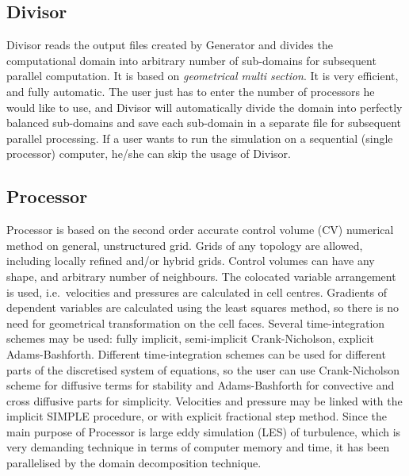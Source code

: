 \documentclass[10pt]{article}
\newcommand*{\tn}{\sffamily} %
\begin{document}
    \subsection{{\tn Divisor}}

    {\tn Divisor} reads the output files created by 
    {\tn Generator} and divides the computational domain into 
    arbitrary number of sub-domains for subsequent parallel 
    computation.
    It is based on {\em geometrical multi section}. It is very
    efficient, and fully automatic. The user just has to
    enter the number of processors he would like to use, and
    {\tn Divisor} will automatically divide the domain into
    perfectly balanced sub-domains and save each sub-domain
    in a separate file for subsequent parallel processing.   
    If a user wants to run the simulation on a sequential 
    (single processor) computer, he/she can skip the usage of 
    {\tn Divisor}.

    \subsection{{\tn Processor}}

    {\tn Processor} is based on the second order
    accurate control volume (CV) numerical method on general, 
    unstructured grid. Grids of any topology are allowed, including
    locally refined and/or hybrid grids. Control volumes can have any
    shape, and arbitrary number of neighbours. The colocated
    variable arrangement is used, i.e.\ velocities and pressures
    are calculated in cell centres. Gradients of dependent
    variables are calculated using the least squares method, so
    there is no need for geometrical transformation on the cell
    faces. Several time-integration schemes may be used: fully
    implicit, semi-implicit Crank-Nicholson, explicit Adams-Bashforth.
    Different time-integration schemes can be used for different
    parts of the discretised system of equations, so the user can use
    Crank-Nicholson scheme for diffusive terms for stability 
    and Adams-Bashforth for convective and cross diffusive parts
    for simplicity. Velocities and pressure may be linked with
    the implicit SIMPLE procedure, or with explicit fractional
    step method.
    Since the main purpose of {\tn Processor} is large eddy simulation
    (LES) of turbulence, which is very demanding technique in 
    terms of computer memory and time, it has been parallelised
    by the domain decomposition technique. 
    
\end{document}
